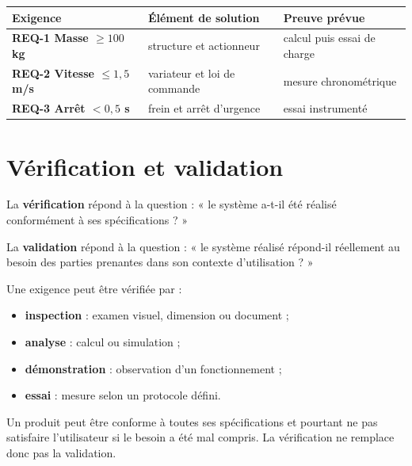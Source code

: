 \begin{ISapplication}[title={Matrice de traçabilité simplifiée}]
\begin{center}
\begin{tabularx}{.92\linewidth}{>{\bfseries}p{.18\linewidth}X X}
\toprule
Exigence & Élément de solution & Preuve prévue \\
\midrule
REQ-1 Masse $\geq100$ kg & structure et actionneur & calcul puis essai de charge \\
REQ-2 Vitesse $\leq1{,}5$ m/s & variateur et loi de commande & mesure chronométrique \\
REQ-3 Arrêt $<0{,}5$ s & frein et arrêt d'urgence & essai instrumenté \\
\bottomrule
\end{tabularx}
\end{center}
\end{ISapplication}

\section{Vérification et validation}\label{sec:is-verification-validation}

\begin{ISdefinition}[title={Vérification}]
La \textbf{vérification} répond à la question : « le système a-t-il été réalisé conformément à ses spécifications ? »
\end{ISdefinition}

\begin{ISdefinition}[title={Validation}]
La \textbf{validation} répond à la question : « le système réalisé répond-il réellement au besoin des parties prenantes dans son contexte d'utilisation ? »
\end{ISdefinition}

Une exigence peut être vérifiée par :
\begin{itemize}
  \item \textbf{inspection} : examen visuel, dimension ou document ;
  \item \textbf{analyse} : calcul ou simulation ;
  \item \textbf{démonstration} : observation d'un fonctionnement ;
  \item \textbf{essai} : mesure selon un protocole défini.
\end{itemize}

\begin{ISattention}
Un produit peut être conforme à toutes ses spécifications et pourtant ne pas satisfaire l'utilisateur si le besoin a été mal compris. La vérification ne remplace donc pas la validation.
\end{ISattention}

